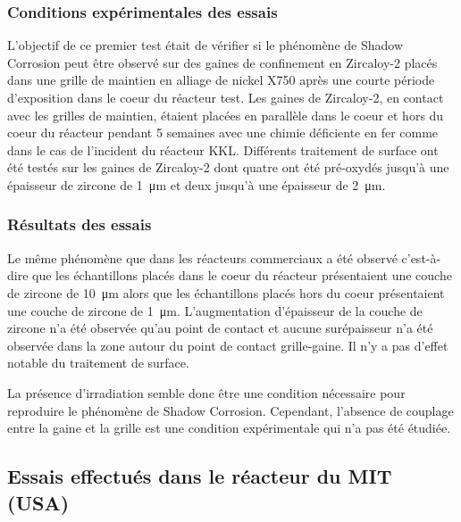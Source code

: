\begin{refsection}
	\subsubsection{Conditions expérimentales des essais}
        L’objectif de ce premier test était de vérifier si le phénomène de Shadow
        Corrosion peut être observé sur des gaines de confinement en Zircaloy-2
        placés dans une grille de maintien en alliage de nickel X750 après une
        courte période d’exposition dans le coeur du réacteur test. Les gaines de
        Zircaloy-2, en contact avec les grilles de maintien, étaient placées en parallèle dans le
        coeur et hors du coeur du réacteur pendant 5 semaines avec une chimie
        déficiente en fer comme dans le cas de l’incident du réacteur KKL.
        Différents traitement de surface ont été testés sur les gaines de Zircaloy-2 dont  
        quatre ont été pré-oxydés jusqu'à une épaisseur de zircone de
        \SI{1}{\micro\meter} et deux jusqu'à une épaisseur de
        \SI{2}{\micro\meter}.
	
	\subsubsection{Résultats des essais}
        Le même phénomène que dans les réacteurs commerciaux a été observé
        c’est-à-dire que les échantillons placés dans le coeur du réacteur présentaient
        une couche de zircone de \SI{10}{\micro\meter} alors que les échantillons
        placés hors du coeur présentaient une couche de zircone de \SI{1}{\micro\meter}. L'augmentation d'épaisseur de la couche
        de zircone n'a été observée qu'au point de contact et aucune surépaisseur n'a été observée dans la zone autour
        du point de contact grille-gaine.
        Il n’y a pas d’effet notable du traitement de surface. 

        La présence d’irradiation
        semble donc être une condition nécessaire pour reproduire le
        phénomène de Shadow Corrosion. Cependant, l’absence de couplage entre la
        gaine et la grille est une condition expérimentale qui n'a pas été étudiée.


    \subsection{Essais effectués dans le réacteur du MIT (USA)}\label{subsec:MIT}


\end{refsection}
